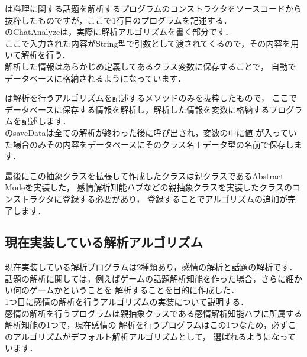 
は料理に関する話題を解析するプログラムのコンストラクタをソースコードから
抜粋したものですが，ここで1行目のプログラムを記述する．
\\

のChatAnalyzeは，実際に解析アルゴリズムを書く部分です．\\
ここで入力された内容がString型で引数として渡されてくるので，その内容を用いて解析を行う．\\
解析した情報はあらかじめ定義してあるクラス変数に保存することで，
自動でデータベースに格納されるようになっています．

は解析を行うアルゴリズムを記述するメソッドのみを抜粋したもので，
ここでデータベースに保存する情報を解析し，解析した情報を変数に格納するプログラムを記述します．
\\

のsaveDataは全ての解析が終わった後に呼び出され，変数の中に値
が入っていた場合のみその内容をデータベースにそのクラス名＋データ型の名前で保存します．

最後にこの抽象クラスを拡張して作成したクラスは親クラスであるAbstract Modeを実装した，
感情解析知能ハブなどの親抽象クラスを実装したクラスのコンストラクタに登録する必要があり，
登録することでアルゴリズムの追加が完了します．\\

\subsection{現在実装している解析アルゴリズム}
現在実装している解析プログラムは2種類あり，感情の解析と話題の解析です．\\

話題の解析に関しては，例えばゲームの話題解析知能を作った場合，さらに細かい何のゲームかということを
解析することを目的に作成した．\\
1つ目に感情の解析を行うアルゴリズムの実装について説明する．\\

感情の解析を行うプログラムは親抽象クラスである感情解析知能ハブに所属する解析知能の1つで，現在感情の
解析を行うプログラムはこの1つなため，必ずこのアルゴリズムがデフォルト解析アルゴリズムとして，
選ばれるようになっています．\\

